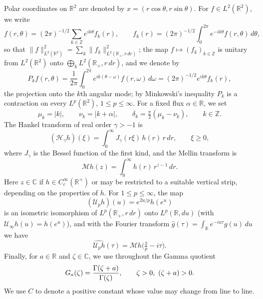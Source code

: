 \documentclass[11pt,a4paper,reqno,backref=page]{amsart}
\newcommand{\R}{\mathbb R}
\newcommand{\Z}{\mathbb Z}
\newcommand{\C}{\mathbb C}
\newcommand{\HH}{\mathcal H}                 %
\newcommand{\Mell}{\mathcal M}               %
\newcommand{\dd}{\,d}
\let\Re\relax\DeclareMathOperator{\Re}{Re}
\newcommand{\Gam}[2]{\frac{\Gamma(#1)}{\Gamma(#2)}}
\numberwithin{equation}{section}
\theoremstyle{definition}
\theoremstyle{remark}
\begin{document}
Polar coordinates on $\R^2$ are 
denoted by $x=(r\cos\theta,r\sin\theta)$.
For $f\in L^2(\R^2)$, we write
\begin{equation}\label{eq:angular}
  f(r,\theta)=(2\pi)^{-1/2}\sum_{k\in\Z}
    e^{ik\theta}f_k(r),\qquad
  f_k(r)=(2\pi)^{-1/2}\int_0^{2\pi}
    e^{-ik\theta}f(r,\theta)\dd\theta,
\end{equation}
so that $\|f\|_{L^2(\R^2)}^2=\sum_k\|f_k\|^2_{L^2(\R_+,r\,dr)}$;
the map $f\mapsto(f_k)_{k\in\Z}$ is unitary from $L^2(\R^2)$
onto $\bigoplus_{k}L^2(\R_+,r\,dr)$, and we denote by
\begin{equation}\label{eq:Pk}
  P_kf(r,\theta)=\frac1{2\pi}\int_0^{2\pi}
    e^{ik(\theta-\omega)}f(r,\omega)\dd\omega
  =(2\pi)^{-1/2}e^{ik\theta}f_k(r),
\end{equation}
the projection onto the $k$th angular mode; by Minkowski's
inequality $P_k$ is a contraction on every $L^p(\R^2)$, $1\le
p\le\infty$. For a fixed flux $\alpha\in\R$, we set
\begin{equation}\label{eq:mudef}
  \mu_k=|k|,\qquad \nu_k=|k+\alpha|,\qquad
  \delta_k=\tfrac{\pi}{2}(\mu_k-\nu_k),\qquad k\in\Z.
\end{equation}
The Hankel transform of real order $\gamma>-1$ is 
\begin{equation}\label{eq:hankel}
  (\HH_\gamma h)(\xi)=\int_0^\infty J_\gamma(r\xi)\,h(r)\,r\dd
  r,\qquad
  \xi\ge0,
\end{equation}
where $J_\gamma$ is the Bessel function of the first kind, and
the Mellin transform is 
\begin{equation}\label{eq:mellin}
  \Mell h(z)=\int_0^\infty h(r)\,r^{z-1}\dd r.
\end{equation}
Here $z\in \C$ if $h\in C^\infty_c(\R^+)$ or may be restricted to a suitable vertical strip, depending on the properties of $h$.
For $1\le p\le\infty$, the map
\begin{equation}\label{eq:Up}
  (\mathcal U_ph)(u)=e^{2u/p}h(e^u)
\end{equation}
is an isometric isomorphism of $L^p(\R_+,r\,dr)$ onto
$L^p(\R,du)$ (with $\mathcal U_\infty h(u)=h(e^u)$), and with
the Fourier transform $\widehat g(\tau)=\int_\R
e^{-iu\tau}g(u)\dd u$ we have
\begin{equation}\label{eq:mellin-fourier}
  \widehat{\mathcal U_ph}(\tau)=\Mell
  h\bigl(\tfrac2p-i\tau\bigr).
\end{equation}
Finally, for $a\in\R$ and $\zeta\in\C$, we use throughout the Gamma quotient
\begin{equation}\label{eq:Ga}
  G_a(\zeta)=\Gam{\zeta+a}{\zeta},\qquad \Re\zeta>0,\
  \Re(\zeta+a)>0.
\end{equation}
We use $C$ to denote a positive constant whose value may change from line
to line.
\end{document}
